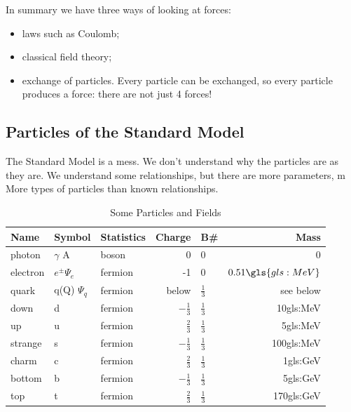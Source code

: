 \documentclass[]{article}
\begin{document}
In summary we have three ways of looking at forces:

\begin{itemize}
	\item laws such as Coulomb;
	\item classical field theory;
	\item exchange of particles. Every particle can be exchanged, so every particle produces a force: there are not just 4 forces! 
\end{itemize}

\subsection{Particles of the Standard Model}

The Standard Model is a mess. We don't understand why the particles are as they are. We understand some relationships, but there are more parameters, m More types of particles than known relationships.

\begin{table}[H]
	\begin{center}
		\caption{Some Particles and Fields}
		\begin{tabular}{|l|l|l|r|l|r|}\hline
			Name&Symbol&Statistics&Charge&B\#&Mass\\ \hline
			photon&$\gamma$ A&boson&0&0&0 \\ \hline
			electron&$e^\pm \Psi_e$&fermion&-1&0&$0.51\gls{gls:MeV}$\\ \hline
			quark&q(Q) $\Psi_q$&fermion&below&$\frac{1}{3}$&see below\\ \hline
			down&d&fermion&$-\frac{1}{3}$&$\frac{1}{3}$&10\gls{gls:MeV}\\ 
			up&u&fermion&$\frac{2}{3}$&$\frac{1}{3}$&5\gls{gls:MeV}\\ \hline
			strange&s&fermion&$-\frac{1}{3}$&$\frac{1}{3}$&100\gls{gls:MeV}\\ 
			charm&c&fermion&$\frac{2}{3}$&$\frac{1}{3}$&1\gls{gls:GeV}\\ \hline
			bottom&b&fermion&$-\frac{1}{3}$&$\frac{1}{3}$&5\gls{gls:GeV}\\ 
			top&t&fermion&$\frac{2}{3}$&$\frac{1}{3}$&170\gls{gls:GeV}\\ \hline
		\end{tabular}
	\end{center}
\end{table}
\end{document}
